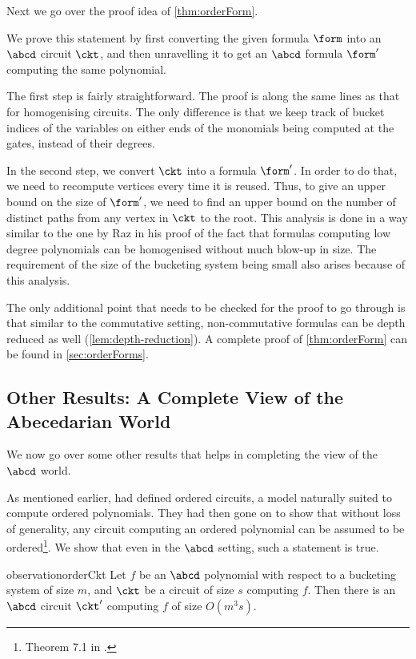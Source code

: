 Next we go over the proof idea of \autoref{thm:orderForm}.

\orderForm*

We prove this statement by first converting the given formula $\form$ into an $\abcd$ circuit $\ckt$, and then unravelling it to get an $\abcd$ formula $\form'$ computing the same polynomial.

The first step is fairly straightforward. 
The proof is along the same lines as that for homogenising circuits.
The only difference is that we keep track of bucket indices of the variables on either ends of the monomials being computed at the gates, instead of their degrees. 

In the second step, we convert $\ckt$ into a formula $\form'$.
In order to do that, we need to recompute vertices every time it is reused.
Thus, to give an upper bound on the size of $\form'$, we need to find an upper bound on the number of distinct paths from any vertex in $\ckt$ to the root.
This analysis is done in a way similar to the one by Raz \cite{R13} in his proof of the fact that formulas computing low degree polynomials can be homogenised without much blow-up in size.
The requirement of the size of the bucketing system being small also arises because of this analysis.

The only additional point that needs to be checked for the proof to go through is that similar to the commutative setting, non-commutative formulas can be depth reduced as well (\autoref{lem:depth-reduction}).
A complete proof of \autoref{thm:orderForm} can be found in \autoref{sec:orderForms}.


\subsection{Other Results: A Complete View of the Abecedarian World}

We now go over some other results that helps in completing the view of the $\abcd$ world.

As mentioned earlier, {\Hrubes} {\etal} \cite{HWY11} had defined ordered circuits, a model naturally suited to compute ordered polynomials. 
They had then gone on to show that without loss of generality, any circuit computing an ordered polynomial can be assumed to be ordered\footnote{Theorem 7.1 in \cite{HWY11}.}. 
We show that even in the $\abcd$ setting, such a statement is true.

\begin{restatable}{observation}{orderCkt}\label{obs:orderCkt}
	Let $f$ be an $\abcd$ polynomial with respect to a bucketing system of size $m$, and $\ckt$ be a circuit of size $s$ computing $f$. 
	Then there is an $\abcd$ circuit $\ckt'$ computing $f$ of size $O(m^3s)$.
\end{restatable}


